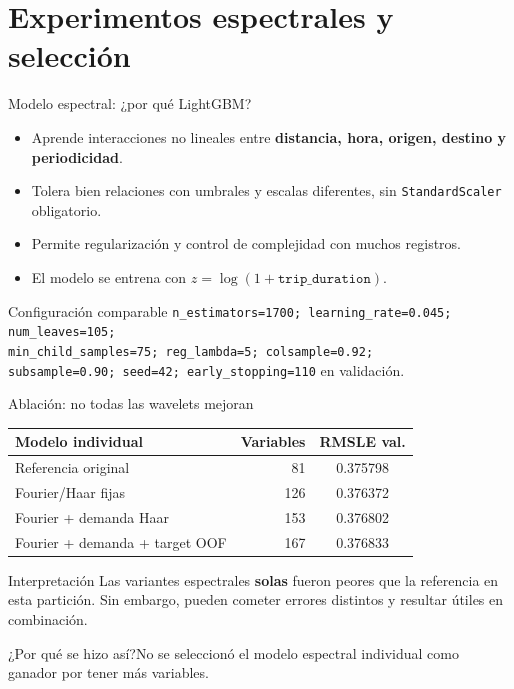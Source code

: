 \documentclass[aspectratio=169,11pt]{beamer}
\newcommand{\porq}[1]{\vspace{1.2mm}\begin{block}{¿Por qué se hizo así?}\small #1\end{block}}
\begin{document}
\section{Experimentos espectrales y selección}
\begin{frame}{Modelo espectral: ¿por qué LightGBM?}
\small
\begin{itemize}
\item Aprende interacciones no lineales entre \textbf{distancia, hora, origen, destino y periodicidad}.
\item Tolera bien relaciones con umbrales y escalas diferentes, sin \texttt{StandardScaler} obligatorio.
\item Permite regularización y control de complejidad con muchos registros.
\item El modelo se entrena con \(z=\log(1+\texttt{trip\_duration})\).
\end{itemize}
\begin{block}{Configuración comparable}
\small \texttt{n\_estimators=1700; learning\_rate=0.045; num\_leaves=105;}\\
\texttt{min\_child\_samples=75; reg\_lambda=5; colsample=0.92;}\\
\texttt{subsample=0.90; seed=42; early\_stopping=110} en validación.
\end{block}
\end{frame}

\begin{frame}{Ablación: no todas las wavelets mejoran}
\small
\begin{center}
\begin{tabular}{lrc}
\toprule
\textbf{Modelo individual} & \textbf{Variables} & \textbf{RMSLE val.}\\
\midrule
Referencia original & 81 & 0.375798\\
Fourier/Haar fijas & 126 & 0.376372\\
Fourier + demanda Haar & 153 & 0.376802\\
Fourier + demanda + target OOF & 167 & 0.376833\\
\bottomrule
\end{tabular}
\end{center}
\begin{block}{Interpretación}
Las variantes espectrales \textbf{solas} fueron peores que la referencia en esta partición. Sin embargo, pueden cometer errores distintos y resultar útiles en combinación.
\end{block}
\porq{No se seleccionó el modelo espectral individual como ganador por tener más variables.}
\end{frame}
\end{document}
